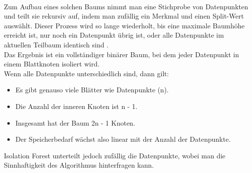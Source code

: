 \documentclass[a4paper,12pt]{article}
\begin{document}
	\\[0.5em]
	Zum Aufbau eines solchen Baums nimmt man eine Stichprobe von Datenpunkten und teilt sie rekursiv auf, indem man zufällig ein Merkmal und einen Split-Wert auswählt. Dieser Prozess wird so lange wiederholt, bis
	eine maximale Baumhöhe erreicht ist, nur noch ein Datenpunkt übrig ist, oder
	alle Datenpunkte im aktuellen Teilbaum identisch sind \cite[S.3]{liu2008isolation}.
	\\[0.5em]
	Das Ergebnis ist ein vollständiger binärer Baum, bei dem jeder Datenpunkt in einem Blattknoten isoliert wird.
	\\[0.5em]
	Wenn alle Datenpunkte unterschiedlich sind, dann gilt:
	\begin{itemize}
	\item Es gibt genauso viele Blätter wie Datenpunkte (n).
	
	\item Die Anzahl der inneren Knoten ist n - 1.
	
	\item Insgesamt hat der Baum 2n - 1 Knoten.
	
	\item Der Speicherbedarf wächst also linear mit der Anzahl der Datenpunkte.
	\end{itemize}
	Isolation Forest unterteilt jedoch zufällig die Datenpunkte, wobei man die Sinnhaftigkeit des Algorithmus hinterfragen kann.
	
\end{document}

